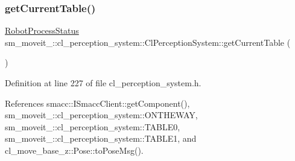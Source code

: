 \subsubsection{\texorpdfstring{get\+Current\+Table()}{getCurrentTable()}}
{\footnotesize\ttfamily \hyperlink{namespacesm__moveit__3_1_1cl__perception__system_a627f57ce4b1b2a0daa56d1b3c51c37ec}{Robot\+Process\+Status} sm\+\_\+moveit\+\_\+::cl\+\_\+perception\+\_\+system\+::\+Cl\+Perception\+System\+::get\+Current\+Table (\begin{DoxyParamCaption}{ }\end{DoxyParamCaption})\hspace{0.3cm}{\ttfamily [inline]}}



Definition at line 227 of file cl\+\_\+perception\+\_\+system.\+h.



References smacc\+::\+I\+Smacc\+Client\+::get\+Component(), sm\+\_\+moveit\+\_\+::cl\+\_\+perception\+\_\+system\+::\+O\+N\+T\+H\+E\+W\+AY, sm\+\_\+moveit\+\_\+::cl\+\_\+perception\+\_\+system\+::\+T\+A\+B\+L\+E0, sm\+\_\+moveit\+\_\+::cl\+\_\+perception\+\_\+system\+::\+T\+A\+B\+L\+E1, and cl\+\_\+move\+\_\+base\+\_\+z\+::\+Pose\+::to\+Pose\+Msg().


